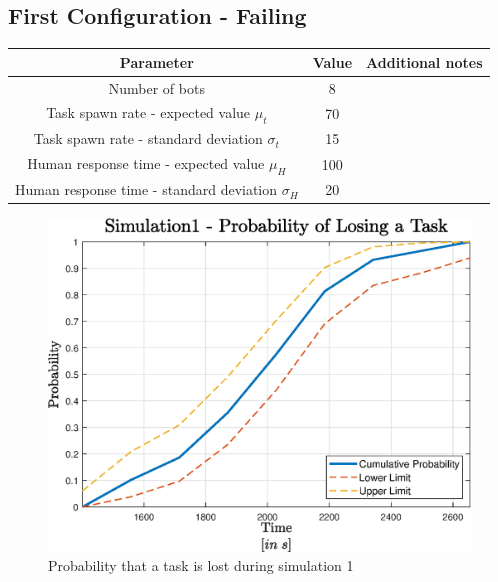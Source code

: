 \documentclass[10pt,a4paper]{article}
\begin{document}
		\subsection{First Configuration - Failing}
			\begin{center}
				\begin{tabular}{ |c|c|c|}
					\hline
					Parameter & Value & Additional notes\\
					\hline
					\hline
					Number of bots & 8 &\\
					\hline
					Task spawn rate - expected value $\mu_t$ & 70 &\\
					\hline					
					Task spawn rate - standard deviation $\sigma_t$ & 15 &\\
					\hline
					Human response time - expected value $\mu_H$ & 100 &\\
					\hline					
					Human response time - standard deviation $\sigma_H$ & 20 &\\
					\hline
				\end{tabular}
			\end{center}
			\begin{figure}[H]
				\centering
					\includegraphics[scale = 0.7]{Images/Simulation1}
					\caption{Probability that a task is lost during simulation 1}
			\end{figure}
		
\end{document}

